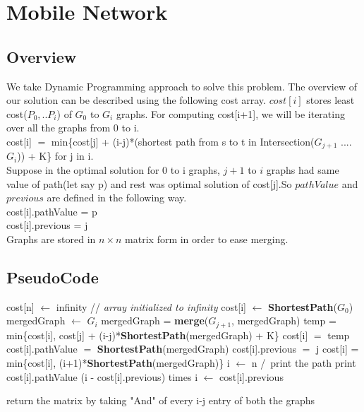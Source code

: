 \documentclass{article}
\begin{document}
\newpage
\section{Mobile Network}
\subsection{Overview}
We take Dynamic Programming approach to solve this problem. The overview of our solution can be described using the following cost array. $cost[i]$ stores 
least cost($P_0,..P_i$) of $G_0$ to $G_i$ graphs. For computing cost[i+1], we will be iterating over all the graphs from 0 to i. \\
cost[i] $=$  min\{cost[j] + (i-j)*(shortest path from s to t in Intersection($G_{j+1}$ .... $G_i$)) + K\} for j in i.\\
Suppose in the optimal solution for 0 to i graphs, $j+1$ to $i$ graphs had same value of path(let say p) and rest was optimal solution of cost[j].So $pathValue$
and $previous$ are defined in the following way.\\
cost[i].pathValue = p \\
cost[i].previous  = j \\
Graphs are stored in $n\times n$ matrix form in order to ease merging.

\subsection{PseudoCode}
\begin{algorithmic}[1]
\State cost[n] $\gets$ infinity // \emph{array initialized to infinity}
\State cost[i] $\gets$  \textbf{ShortestPath}($G_0$)
\Else
\State mergedGraph $\gets$ $G_i$
\State mergedGraph = \textbf{merge}($G_{j+1}$, mergedGraph)
\State temp = min\{cost[i], cost[j] + (i-j)*\textbf{ShortestPath}(mergedGraph) + K\}
\State cost[i] $=$ temp
\State cost[i].pathValue $=$ \textbf{ShortestPath}(mergedGraph)
\State cost[i].previous  $=$ j
\EndIf
\EndFor
\State cost[i] = min\{cost[i], (i+1)*\textbf{ShortestPath}(mergedGraph)\}
\EndIf
\EndFor
\State i $\gets$ n
     \hspace*{2cm} /\ print the path
\State print cost[i].pathValue (i - cost[i].previous) times
\State i $\gets$ cost[i].previous
\EndWhile
\EndProcedure
\end{algorithmic}

\vspace*{0.2cm}
\begin{algorithmic}[1]
    \State return the matrix by taking "And" of every i-j entry of both the graphs
    \EndProcedure 
\end{algorithmic}
\end{document}
